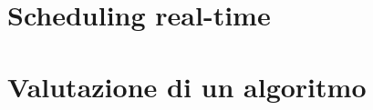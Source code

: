 \subsection{}




















\section{Scheduling real-time}
\section{Valutazione di un algoritmo}

